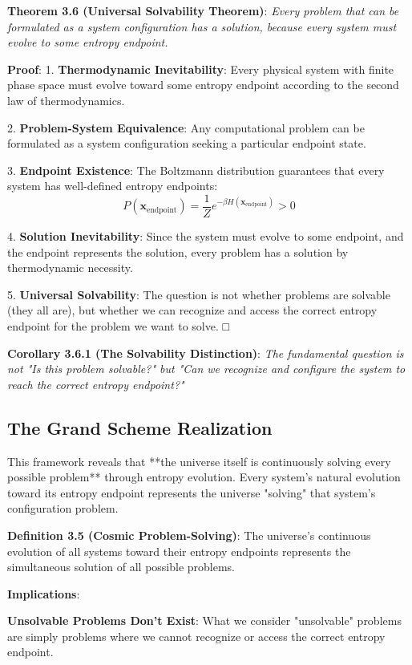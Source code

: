 \documentclass[12pt,a4paper]{article}
\theoremstyle{definition}
\begin{document}
\textbf{Theorem 3.6 (Universal Solvability Theorem)}: \textit{Every problem that can be formulated as a system configuration has a solution, because every system must evolve to some entropy endpoint.}

\textbf{Proof}:
1. \textbf{Thermodynamic Inevitability}: Every physical system with finite phase space must evolve toward some entropy endpoint according to the second law of thermodynamics.

2. \textbf{Problem-System Equivalence}: Any computational problem can be formulated as a system configuration seeking a particular endpoint state.

3. \textbf{Endpoint Existence}: The Boltzmann distribution guarantees that every system has well-defined entropy endpoints:
   $$P(\mathbf{x}_{\text{endpoint}}) = \frac{1}{Z}e^{-\beta H(\mathbf{x}_{\text{endpoint}})} > 0$$

4. \textbf{Solution Inevitability}: Since the system must evolve to some endpoint, and the endpoint represents the solution, every problem has a solution by thermodynamic necessity.

5. \textbf{Universal Solvability}: The question is not whether problems are solvable (they all are), but whether we can recognize and access the correct entropy endpoint for the problem we want to solve. □

\textbf{Corollary 3.6.1 (The Solvability Distinction)}: \textit{The fundamental question is not "Is this problem solvable?" but "Can we recognize and configure the system to reach the correct entropy endpoint?"}

\subsection{The Grand Scheme Realization}

This framework reveals that **the universe itself is continuously solving every possible problem** through entropy evolution. Every system's natural evolution toward its entropy endpoint represents the universe "solving" that system's configuration problem.

\textbf{Definition 3.5 (Cosmic Problem-Solving)}: The universe's continuous evolution of all systems toward their entropy endpoints represents the simultaneous solution of all possible problems.

\textbf{Implications}:

\textbf{Unsolvable Problems Don't Exist}: What we consider "unsolvable" problems are simply problems where we cannot recognize or access the correct entropy endpoint.
\end{document}
